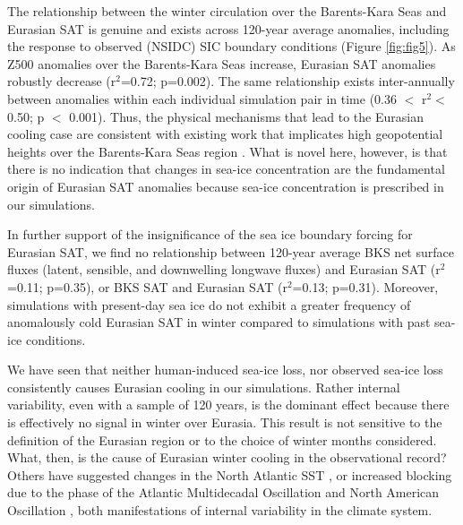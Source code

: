 \documentclass{nature}
\begin{document}
The relationship between the winter circulation over the Barents-Kara Seas and Eurasian SAT is genuine and exists across 120-year average anomalies, including the response to observed (NSIDC) SIC boundary conditions (Figure \ref{fig:fig5}). As Z500 anomalies over the Barents-Kara Seas increase, Eurasian SAT anomalies robustly decrease (r$^2$=0.72; p=0.002). The same relationship exists inter-annually between anomalies within each individual simulation pair in time (0.36 $<$ r$^2<$ 0.50; p $<$ 0.001). Thus, the physical mechanisms that lead to the Eurasian cooling case are consistent with existing work that implicates high geopotential heights over the Barents-Kara Seas region \cite{honda09,petoukhov10,mori14}. What is novel here, however, is that there is no indication that changes in sea-ice concentration are the fundamental origin of Eurasian SAT anomalies because sea-ice concentration is prescribed in our simulations. 

In further support of the insignificance of the sea ice boundary forcing for Eurasian SAT, we find no relationship between 120-year average BKS net surface fluxes (latent, sensible, and downwelling longwave fluxes) and Eurasian SAT (r$^2$=0.11; p=0.35), or BKS SAT and Eurasian SAT (r$^2$=0.13; p=0.31). Moreover, simulations with present-day sea ice do not exhibit a greater frequency of anomalously cold Eurasian SAT in winter compared to simulations with past sea-ice conditions.

We have seen that neither human-induced sea-ice loss, nor observed sea-ice loss consistently causes Eurasian cooling in our simulations. Rather internal variability, even with a sample of 120 years, is the dominant effect because there is effectively no signal in winter over Eurasia. This result is not sensitive to the definition of the Eurasian region or to the choice of winter months considered. What, then, is the cause of Eurasian winter cooling in the observational record? Others have suggested changes in the North Atlantic SST \cite{sato14}, or increased blocking due to the phase of the Atlantic Multidecadal Oscillation and North American Oscillation \cite{peings14b}, both manifestations of internal variability in the climate system. 
\end{document}

